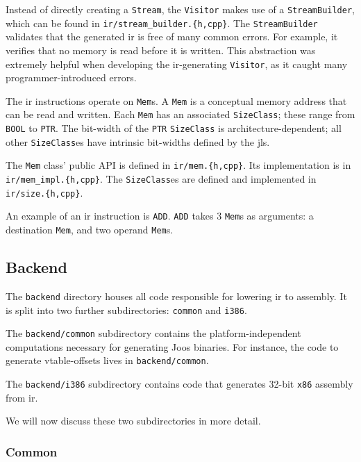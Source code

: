 \documentclass[12pt, titlepage]{article}
\newcommand{\z}[1]{\texttt{#1}}
\begin{document}
Instead of directly creating a \z{Stream}, the \z{Visitor} makes use of a
\z{StreamBuilder}, which can be found in \z{ir/stream\_builder.\{h,cpp\}}. The
\z{StreamBuilder} validates that the generated \ac{ir} is free of many common
errors. For example, it verifies that no memory is read before it is written.
This abstraction was extremely helpful when developing the \ac{ir}-generating
\z{Visitor}, as it caught many programmer-introduced errors.

The \ac{ir} instructions operate on \z{Mem}s. A \z{Mem} is a conceptual memory
address that can be read and written. Each \z{Mem} has an associated
\z{SizeClass}; these range from \z{BOOL} to \z{PTR}. The bit-width of the
\z{PTR} \z{SizeClass} is architecture-dependent; all other \z{SizeClass}es have
intrinsic bit-widths defined by the \ac{jls}.

The \z{Mem} class' public API is defined in \z{ir/mem.\{h,cpp\}}. Its
implementation is in \\\z{ir/mem\_impl.\{h,cpp\}}. The \z{SizeClass}es are
defined and implemented in \z{ir/size.\{h,cpp\}}.

An example of an \ac{ir} instruction is \z{ADD}. \z{ADD} takes 3 \z{Mem}s as
arguments: a destination \z{Mem}, and two operand \z{Mem}s.

\subsection{Backend}\label{subsec:backend}

The \z{backend} directory houses all code responsible for lowering \ac{ir} to
assembly. It is split into two further subdirectories: \z{common} and \z{i386}.

The \z{backend/common} subdirectory contains the platform-independent
computations necessary for generating Joos binaries. For instance, the code to
generate vtable-offsets lives in \z{backend/common}.

The \z{backend/i386} subdirectory contains code that generates 32-bit \z{x86}
assembly from \ac{ir}.

We will now discuss these two subdirectories in more detail.

\subsubsection{Common}\label{subsubsec:common}
\end{document}
